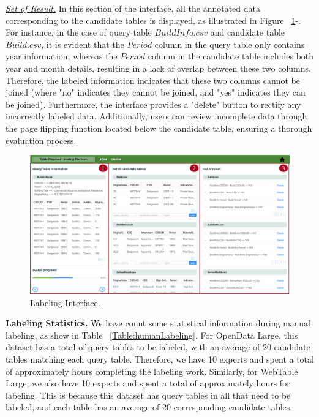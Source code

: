 \noindent \underline{\textit{Set of Result.}} In this section of the interface, all the annotated data corresponding to the candidate tables is displayed, as illustrated in Figure ~\ref{fig:interface}-. For instance, in the case of query table $BuildInfo.csv$ and candidate table $Build.csv$, it is evident that the $Period$ column in the query table only contains year information, whereas the  $Period$ column in the candidate table includes both year and month details, resulting in a lack of overlap between these two columns. Therefore, the labeled information indicates that these two columns cannot be joined (where "no" indicates they cannot be joined, and "yes" indicates they can be joined).
Furthermore, the interface provides a "delete" button to rectify any incorrectly labeled data. Additionally, users can review incomplete data through the page flipping function located below the candidate table, ensuring a thorough evaluation process.




\begin{figure}[h]
	\centering
	\includegraphics[width=1.0\linewidth]{fig/interface.pdf}
	\caption{Labeling Interface.}
	\label{fig:interface}
\end{figure}

\noindent \textbf{Labeling Statistics.} 
We have count some statistical information during manual labeling, as show in Table ~\ref{Table:humanLabeling}. For OpenData Large, this dataset has a total of   query tables to be labeled, with an average of 20 candidate tables matching each query table. Therefore, we have 10 experts and spent a total of approximately  hours completing the labeling work. Similarly, for WebTable Large, we also have 10 experts and spent a total of approximately  hours for labeling. This is because this dataset has  query tables in all that need to be labeled, and each table has an average of 20 corresponding candidate tables.

